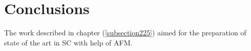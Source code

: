 \chapter*{Conclusions }\label{conclusions}

\lipsum[1]

The work described in chapter  (\autoref{subsection225})
aimed for the preparation\cite{T40} of
state of the art  in \acs{SC} with help of \acs{AFM}.


\lipsum[2-9]
